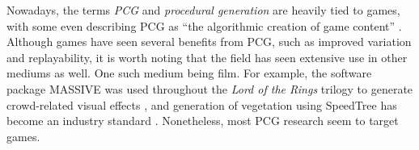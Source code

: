 Nowadays, the terms \textit{PCG} and \textit{procedural generation} are heavily tied to games, with some even describing PCG as ``the algorithmic creation of game content'' \cite[p.1]{pcg_in_games}.
Although games have seen several benefits from PCG, such as improved variation and replayability, it is worth noting that the field has seen extensive use in other mediums as well.
One such medium being film.
For example, the software package MASSIVE was used throughout the \textit{Lord of the Rings} trilogy to generate crowd-related visual effects \cite{massive}, and generation of vegetation using SpeedTree has become an industry standard \cite{speedtree_cinema}.
Nonetheless, most PCG research seem to target games.
